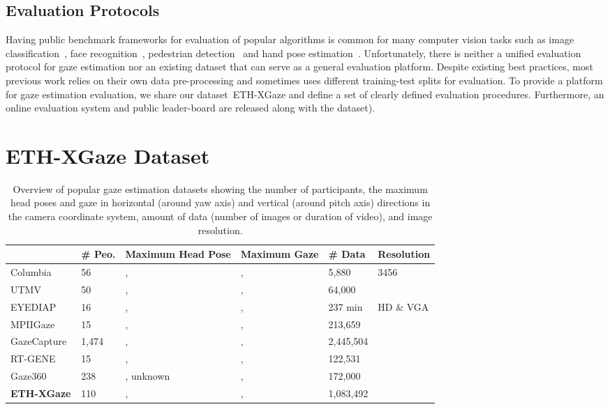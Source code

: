 \documentclass[runningheads]{llncs}
\newcommand{\datasetname}{ETH-XGaze\xspace}
\newcommand{\numparticipant}{110\xspace}
\newcommand{\numsample}{1,083,492\xspace}
\begin{document}
\subsection{Evaluation Protocols}
Having public benchmark frameworks for evaluation of popular algorithms is common for many computer vision tasks such as image classification~\cite{russakovsky2015imagenet}, face recognition~\cite{kemelmacher2016megaface}, pedestrian detection~\cite{dollar2011pedestrian} and hand pose estimation~\cite{zimmermann2019freihand}.
Unfortunately, there is neither a unified evaluation protocol for gaze estimation nor an existing dataset that can serve as a general evaluation platform.
Despite existing best practices, most previous work relies on their own data pre-processing and sometimes uses different training-test splits for evaluation. 
To provide a platform for gaze estimation evaluation, we share our dataset~\datasetname and define a set of clearly defined evaluation procedures. Furthermore, an online evaluation system and public leader-board are released along with the dataset).  
\section{\datasetname Dataset}

\begin{table}[t]
\centering
\begin{tabularx}{\textwidth}{P{2.1cm} C{1.5cm} C{2.2cm} C{2.2cm} C{1.8cm} C{1.9cm}}
\toprule
& \textbf{\# Peo.} & \textbf{Maximum Head Pose} & \textbf{Maximum Gaze} & \textbf{\# Data} & \textbf{Resolution} \\
\midrule
Columbia~\cite{smith2013gaze} & 56 & ,  & ,  & 5,880 & 3456 \\
UTMV~\cite{sugano2014learning} & 50 & ,  & ,  & 64,000 & \\
EYEDIAP~\cite{funes2014eyediap} & 16 & ,  & ,  & 237 min & HD \& VGA \\
MPIIGaze~\cite{zhang2019mpiigaze} & 15 & ,  & ,  & 213,659 &  \\
GazeCapture~\cite{krafka2016eye} & 1,474 & ,  & ,  & 2,445,504 & \\
RT-GENE~\cite{fischer2018rt} & 15 & ,  & ,  & 122,531 & \\
Gaze360~\cite{kellnhofer2019gaze360} & 238 & , unknown & ,  & 172,000 &  \\
\midrule
\textbf{\datasetname} & \numparticipant & ,  & ,  & \numsample &  \\
\bottomrule
\end{tabularx}
\caption{Overview of popular gaze estimation datasets showing the number of participants, the maximum head poses and gaze in horizontal (around yaw axis) and vertical (around pitch axis) directions in the camera coordinate system, amount of data (number of images or duration of video), and image resolution.}
\label{tab:other_datasets}
\end{table}
\end{document}
